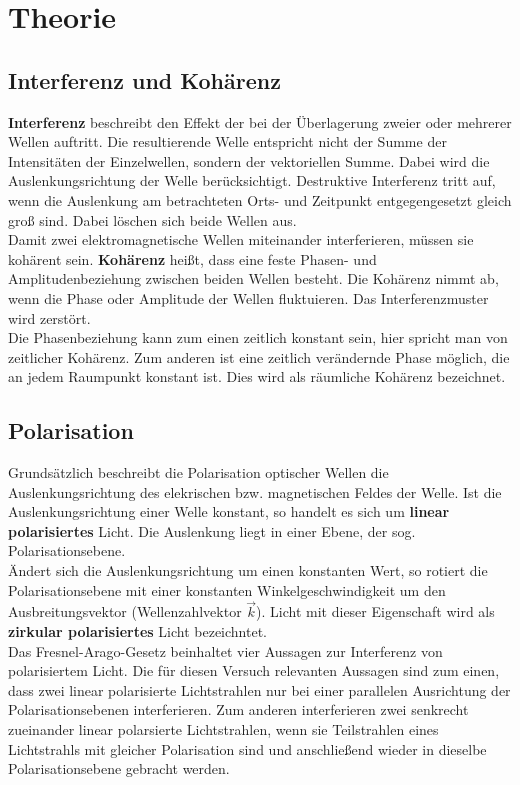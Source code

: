 \section{Theorie}
\label{sec:Theorie}

\subsection{Interferenz und Kohärenz}
\textbf{Interferenz} beschreibt den Effekt der bei der Überlagerung zweier oder mehrerer Wellen auftritt.
Die resultierende Welle entspricht nicht der Summe der Intensitäten der Einzelwellen, sondern der vektoriellen Summe.
Dabei wird die Auslenkungsrichtung der Welle berücksichtigt.
Destruktive Interferenz tritt auf, wenn die Auslenkung am betrachteten Orts- und Zeitpunkt entgegengesetzt gleich groß sind.
Dabei löschen sich beide Wellen aus.
\\
Damit zwei elektromagnetische Wellen miteinander interferieren, müssen sie kohärent sein.
\textbf{Kohärenz} heißt, dass eine feste Phasen- und Amplitudenbeziehung zwischen beiden Wellen besteht.
Die Kohärenz nimmt ab, wenn die Phase oder Amplitude der Wellen fluktuieren.
Das Interferenzmuster wird zerstört.
\\
Die Phasenbeziehung kann zum einen zeitlich konstant sein, hier spricht man von zeitlicher Kohärenz.
Zum anderen ist eine zeitlich verändernde Phase möglich, die an jedem Raumpunkt konstant ist.
Dies wird als räumliche Kohärenz bezeichnet.

\subsection{Polarisation}
\label{sec:polarisation}

Grundsätzlich beschreibt die Polarisation optischer Wellen die Auslenkungsrichtung des elekrischen bzw. magnetischen Feldes der Welle.
Ist die Auslenkungsrichtung einer Welle konstant, so handelt es sich um \textbf{linear polarisiertes} Licht.
Die Auslenkung liegt in einer Ebene, der sog. Polarisationsebene.
\\
Ändert sich die Auslenkungsrichtung um einen konstanten Wert, so rotiert die Polarisationsebene mit einer konstanten Winkelgeschwindigkeit um den Ausbreitungsvektor (Wellenzahlvektor $\vec{k}$).
Licht mit dieser Eigenschaft wird als \textbf{zirkular polarisiertes} Licht bezeichntet.
\\
Das Fresnel-Arago-Gesetz\cite{hecht2018optik} beinhaltet vier Aussagen zur Interferenz von polarisiertem Licht.
Die für diesen Versuch relevanten Aussagen sind zum einen, dass zwei linear polarisierte Lichtstrahlen nur bei einer parallelen Ausrichtung der Polarisationsebenen interferieren.
Zum anderen interferieren zwei senkrecht zueinander linear polarsierte Lichtstrahlen, wenn sie Teilstrahlen eines Lichtstrahls mit gleicher Polarisation sind und anschließend wieder in dieselbe Polarisationsebene gebracht werden.

